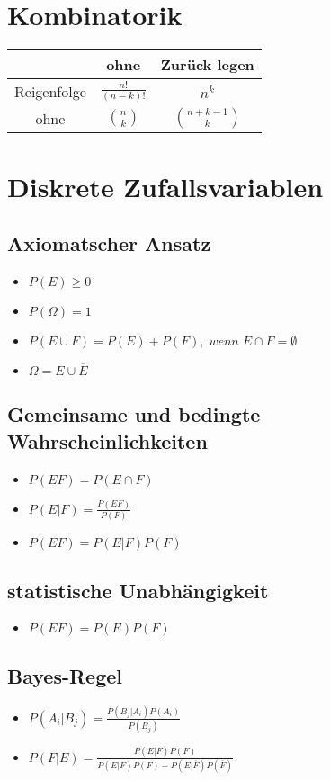 \documentclass{article}
\begin{document}
\section{Kombinatorik}
\begin{tabular}{c| c |c}
  & ohne & Zurück legen \\ \hline
  Reigenfolge & $\frac{n!}{(n-k)!}$&$n^k$ \\
  ohne&${n \choose k}$ & ${n + k -1 \choose k}$ \\
  
\end{tabular}

\section{Diskrete Zufallsvariablen}
\subsection{Axiomatscher Ansatz}
\begin{itemize}
\item $P(E)\geq 0$
\item $P(\Omega) = 1$
\item $P(E\cup F) = P(E)+P(F), \; wenn\;  E\cap F = \emptyset $
\item $\Omega = E \cup \overline{E}$
\end{itemize}


\subsection{Gemeinsame und bedingte Wahrscheinlichkeiten}
\begin{itemize}
\item$P(EF) = P(E\cap F)$
\item $P(E|F) = \frac{P(EF)}{P(F)}$
\item $P(EF) = P(E|F)P(F)$
\end{itemize}




\subsection{statistische Unabhängigkeit}
\begin{itemize}
\item $P(EF) = P(E) P(F)$
\end{itemize}

\subsection{Bayes-Regel}
\begin{itemize}
\item $P(A_i|B_j) = \frac{P(B_j|A_i)P(A_i)}{P(B_j)}$
\item $P(F|E) = \frac{P(E|F) P(F)}{P(E|F) P(F)+P(E|\overline{F})P(\overline{F})}$
\end{itemize}
\end{document}
